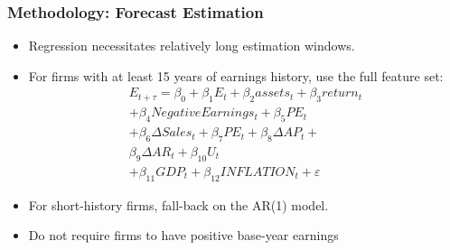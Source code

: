 \documentclass{beamer}
\begin{document}
\begin{frame}
\frametitle{Methodology: Forecast Estimation}
\begin{itemize}
\item Regression necessitates relatively long estimation windows. 
\item For firms with at least 15 years of earnings history, use the full feature set:
\begin{equation}
\begin{split}
E_{t+\tau} = \beta_{0} + \beta_{1}E_{t} + \beta_{2}assets_{t} + \beta_{3}return_{t} \\
+ \beta_{4}Negative Earnings_{t} + \beta_{5}PE_{t} \\
+ \beta_{6}\Delta Sales_{t} + \beta_{7}PE_{t} + \beta_{8}\Delta AP_{t} + \\
  \beta_{9}\Delta AR_{t} + \beta_{10}U_{t} \\
+ \beta_{11}GDP_{t} + \beta_{12}INFLATION_{t} + 
  \varepsilon
\end{split}
\end{equation}
\item For short-history firms, fall-back on the AR(1) model.
\item Do not require firms to have positive base-year earnings
\end{itemize}
\end{frame}
\end{document}
